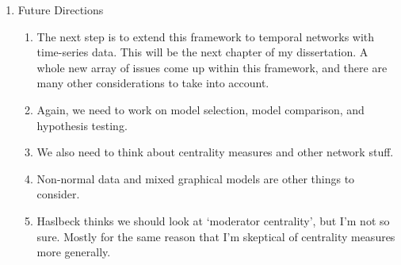 \begin{enumerate}
\begin{enumerate}
        \item To achieve asymptotic error control, a few assumptions are made in Wasserman and Roeder (2008) regarding crucial assumptions for the variable selection procedure $\tilde{S}$. $A1.\ Screening\ property: \lim_{n \to \infty} \mathbb{P}\lbrack\tilde{S}\supseteq S\rbrack = 1$. $A2.\ Sparsity\ property: |\tilde{S}| < n/2$.
        \item Here are the two error-control procedures:
        \begin{enumerate}
            \item \textbf{FWER}: Assume (A1) and (A2). Let $\alpha,\,\gamma \in (0,1)$. If the null hypothesis $H_{0,j}:\beta_j = 0$ gets rejected whenever $Q_j(\gamma)\leq\alpha$, the family-wise error rate is controlled at level $\alpha$:
            $\limsup\limits_{n\rightarrow\infty}\mathbb{P}\big\lbrack\min\limits_{j\in N} Q_j(\gamma)\leq\alpha\big\rbrack\leq\alpha$. 
            \item \textbf{FDR}: Assume (A1) and (A2). Let $q\in(0,1)$. Let $\hat{S}_{multi;FDR}$ be the set of selected variables and $V = |\hat{S}_{multi;FDR}\cap N|$ and $R = |\hat{S}_{multi;FDR}|$. The FDR with $Q = V/\max\{1,R\}$ is then asymptotically controlled at level $q\sum_{i=1}^p i\inv$, i.e., $\limsup\limits_{n\to\infty}\mathbb{E}(Q)\leq q\sum_{i=1}^p \frac{1}{i}$.
        \end{enumerate}
    \end{enumerate}
    \item Future Directions
    \begin{enumerate}
        \item The next step is to extend this framework to temporal networks with time-series data. This will be the next chapter of my dissertation. A whole new array of issues come up within this framework, and there are many other considerations to take into account.
        \item Again, we need to work on model selection, model comparison, and hypothesis testing.
        \item We also need to think about centrality measures and other network stuff.
        \item Non-normal data and mixed graphical models are other things to consider.
        \item Haslbeck thinks we should look at `moderator centrality', but I'm not so sure. Mostly for the same reason that I'm skeptical of centrality measures more generally.

\end{enumerate}
\end{enumerate}
